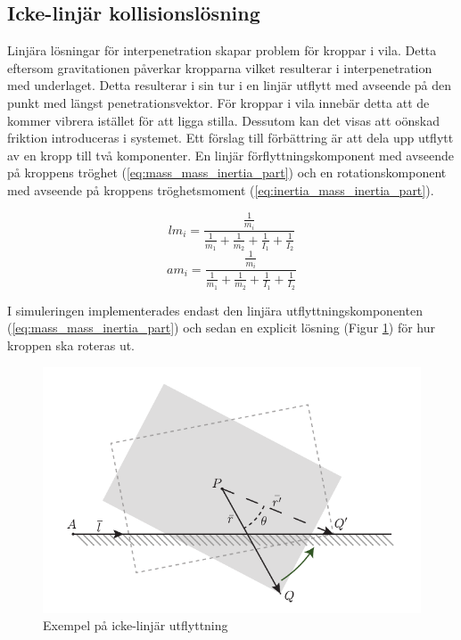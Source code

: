 \documentclass[a4paper,12pt,twopage,swedish]{article}
\begin{document}
	\subsection{Icke-linjär kollisionslösning}

		Linjära lösningar för interpenetration skapar problem för kroppar i vila. Detta eftersom gravitationen påverkar kropparna vilket resulterar i interpenetration med underlaget. Detta resulterar i sin tur i en linjär utflytt med avseende på den punkt med längst penetrationsvektor. För kroppar i vila innebär detta att de kommer vibrera istället för att ligga stilla. Dessutom kan det visas att oönskad friktion introduceras i systemet. Ett förslag till förbättring är att dela upp utflytt av en kropp till två komponenter. En linjär förflyttningskomponent med avseende på kroppens tröghet (\ref{eq:mass_mass_inertia_part}) och en rotationskomponent med avseende på kroppens tröghetsmoment (\ref{eq:inertia_mass_inertia_part}).
		
		\begin{equation}\label{eq:mass_mass_inertia_part}
		 	lm_i = \frac{\frac{1}{m_i}}{\frac{1}{m_1} + \frac{1}{m_2} + \frac{1}{I_1} + \frac{1}{I_2}}
		\end{equation}
		\begin{equation}\label{eq:inertia_mass_inertia_part}
		 	am_i = \frac{\frac{1}{m_i}}{\frac{1}{m_1} + \frac{1}{m_2} + \frac{1}{I_1} + \frac{1}{I_2}}
		\end{equation}

		I simuleringen implementerades endast den linjära utflyttningskomponenten (\ref{eq:mass_mass_inertia_part}) och sedan en explicit lösning (Figur \ref{fig:nonlinear}) för hur kroppen ska roteras ut.
				
						\begin{figure}[h!]
							\centering
							\includegraphics{illustrations/nonlinear.pdf}
							\caption{Exempel på icke-linjär utflyttning}
							\label{fig:nonlinear}
						\end{figure}
		
\end{document}
